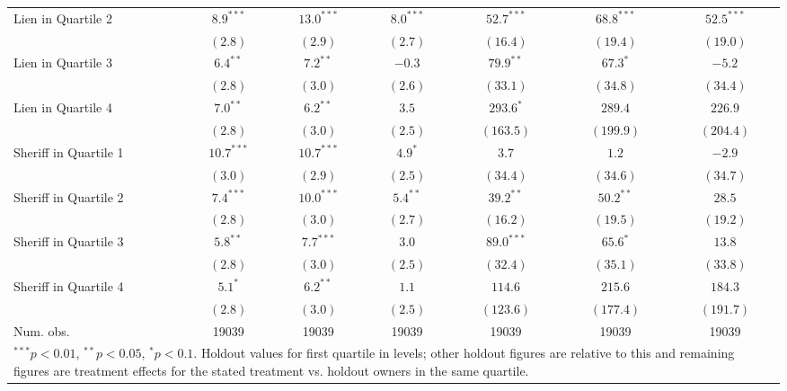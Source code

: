 \begin{table}[htbp]
\begin{center}
\begin{tabular}{l c c c c c c }
Lien in Quartile 2    & $8.9^{***}$   & $13.0^{***}$  & $8.0^{***}$  & $52.7^{***}$  & $68.8^{***}$   & $52.5^{***}$   \\
                      & $(2.8)$       & $(2.9)$       & $(2.7)$      & $(16.4)$      & $(19.4)$       & $(19.0)$       \\
Lien in Quartile 3    & $6.4^{**}$    & $7.2^{**}$    & $-0.3$       & $79.9^{**}$   & $67.3^{*}$     & $-5.2$         \\
                      & $(2.8)$       & $(3.0)$       & $(2.6)$      & $(33.1)$      & $(34.8)$       & $(34.4)$       \\
Lien in Quartile 4    & $7.0^{**}$    & $6.2^{**}$    & $3.5$        & $293.6^{*}$   & $289.4$        & $226.9$        \\
                      & $(2.8)$       & $(3.0)$       & $(2.5)$      & $(163.5)$     & $(199.9)$      & $(204.4)$      \\
Sheriff in Quartile 1 & $10.7^{***}$  & $10.7^{***}$  & $4.9^{*}$    & $3.7$         & $1.2$          & $-2.9$         \\
                      & $(3.0)$       & $(2.9)$       & $(2.5)$      & $(34.4)$      & $(34.6)$       & $(34.7)$       \\
Sheriff in Quartile 2 & $7.4^{***}$   & $10.0^{***}$  & $5.4^{**}$   & $39.2^{**}$   & $50.2^{**}$    & $28.5$         \\
                      & $(2.8)$       & $(3.0)$       & $(2.7)$      & $(16.2)$      & $(19.5)$       & $(19.2)$       \\
Sheriff in Quartile 3 & $5.8^{**}$    & $7.7^{***}$   & $3.0$        & $89.0^{***}$  & $65.6^{*}$     & $13.8$         \\
                      & $(2.8)$       & $(3.0)$       & $(2.5)$      & $(32.4)$      & $(35.1)$       & $(33.8)$       \\
Sheriff in Quartile 4 & $5.1^{*}$     & $6.2^{**}$    & $1.1$        & $114.6$       & $215.6$        & $184.3$        \\
                      & $(2.8)$       & $(3.0)$       & $(2.5)$      & $(123.6)$     & $(177.4)$      & $(191.7)$      \\
\hline
Num. obs.             & 19039         & 19039         & 19039        & 19039         & 19039          & 19039          \\
\hline
\multicolumn{7}{l}{\scriptsize{\parbox{.75\linewidth}{$^{***}p<0.01$, $^{**}p<0.05$, $^*p<0.1$. Holdout values for first quartile in levels; other holdout figures are relative to this and remaining figures are treatment effects for the stated treatment vs. holdout owners in the same quartile.}}}
\end{tabular}
\label{lpm_hetero}
\end{center}
\end{table}
